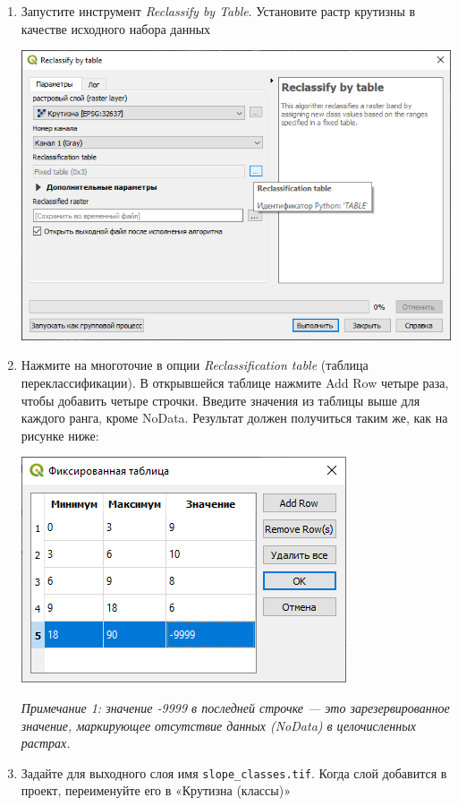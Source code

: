 \documentclass[
  12pt,
]{book}
\begin{document}
\begin{enumerate}
\def\labelenumi{\arabic{enumi}.}
\item
  Запустите инструмент \emph{Reclassify by Table}. Установите растр крутизны в качестве исходного набора данных

  \includegraphics{images/Ex12/reclassify_qgis.png}
\item
  Нажмите на многоточие в опции \emph{Reclassification table} (таблица переклассификации). В открывшейся таблице нажмите Add Row четыре раза, чтобы добавить четыре строчки. Введите значения из таблицы выше для каждого ранга, кроме NoData. Результат должен получиться таким же, как на рисунке ниже:

  \includegraphics{images/Ex12/reclassify_qgis2.png}

  \emph{Примечание 1: значение -9999 в последней строчке --- это зарезервированное значение, маркирующее отсутствие данных (NoData) в целочисленных растрах.}
\item
  Задайте для выходного слоя имя \texttt{slope\_classes.tif}. Когда слой добавится в проект, переименуйте его в «Крутизна (классы)»


\end{enumerate}
\end{document}
